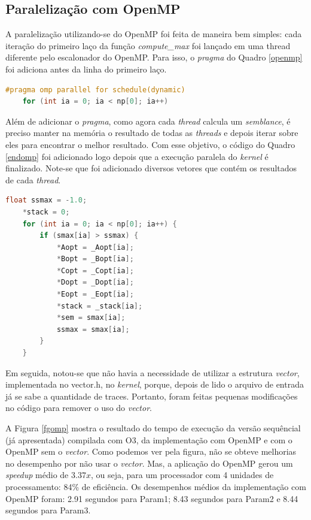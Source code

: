 \documentclass[12pt]{article}
\begin{document}
\subsection{Paralelização com OpenMP} \label{omp}

A paralelização utilizando-se do OpenMP foi feita de maneira bem simples: cada iteração do primeiro laço da função \textit{compute\_max} foi lançado em uma thread diferente pelo escalonador do OpenMP. Para isso, o \textit{pragma} do Quadro \ref{openmp} foi adiciona antes da linha do primeiro laço.
\\
\begin{lstlisting}[language=c, caption=\textit{Pragma} para paralelização com OpenMP., label=openmp]
    #pragma omp parallel for schedule(dynamic)
    for (int ia = 0; ia < np[0]; ia++) 
\end{lstlisting}

Além de adicionar o \textit{pragma}, como agora cada \textit{thread} calcula um \textit{semblance}, é preciso manter na memória o resultado de todas as \textit{threads} e depois iterar sobre eles para encontrar o melhor resultado. Com esse objetivo, o código do Quadro \ref{endomp} foi adicionado logo depois que a execução paralela do \textit{kernel} é finalizado. Note-se que foi adicionado diversos vetores que contém os resultados de cada \textit{thread}. \\

\begin{lstlisting}[language=c, caption=Código para selecionar o melhor resultado entre os resultados calculados por cada \textit{thread}., label=endomp]
    float ssmax = -1.0;
    *stack = 0;
    for (int ia = 0; ia < np[0]; ia++) {
        if (smax[ia] > ssmax) {
            *Aopt = _Aopt[ia];
            *Bopt = _Bopt[ia];
            *Copt = _Copt[ia];
            *Dopt = _Dopt[ia];
            *Eopt = _Eopt[ia];
            *stack = _stack[ia];
            *sem = smax[ia];
            ssmax = smax[ia];
        }
    }
\end{lstlisting}

Em seguida, notou-se que não havia a necessidade de utilizar a estrutura \textit{vector}, implementada no vector.h, no \textit{kernel}, porque, depois de lido o arquivo de entrada já se sabe a quantidade de traces. Portanto, foram feitas pequenas modificações no código para remover o uso do \textit{vector}. 

A Figura \ref{fgomp} mostra o resultado do tempo de execução da versão sequêncial (já apresentada) compilada com O3, da implementação com OpenMP e com o OpenMP sem o \textit{vector}. Como podemos ver pela figura, não se obteve melhorias no desempenho por não usar o \textit{vector}. Mas, a aplicação do OpenMP gerou um \textit{speedup} médio de $3.37x$, ou seja, para um processador com 4 unidades de processamento: 84\% de eficiência. Os desempenhos médios da implementação com OpenMP foram: 2.91 segundos para Param1; 8.43 segundos para Param2 e 8.44 segundos para Param3.
\end{document}
